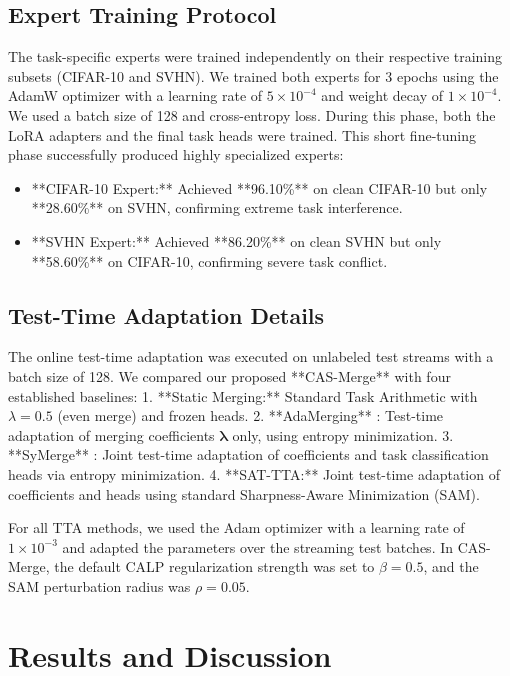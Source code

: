 \documentclass{article}
\begin{document}
\subsection{Expert Training Protocol}
The task-specific experts were trained independently on their respective training subsets (CIFAR-10 and SVHN). We trained both experts for 3 epochs using the AdamW optimizer with a learning rate of $5 \times 10^{-4}$ and weight decay of $1 \times 10^{-4}$. We used a batch size of 128 and cross-entropy loss. During this phase, both the LoRA adapters and the final task heads were trained. This short fine-tuning phase successfully produced highly specialized experts:
\begin{itemize}
    \item **CIFAR-10 Expert:** Achieved **96.10\%** on clean CIFAR-10 but only **28.60\%** on SVHN, confirming extreme task interference.
    \item **SVHN Expert:** Achieved **86.20\%** on clean SVHN but only **58.60\%** on CIFAR-10, confirming severe task conflict.
\end{itemize}

\subsection{Test-Time Adaptation Details}
The online test-time adaptation was executed on unlabeled test streams with a batch size of 128. We compared our proposed **CAS-Merge** with four established baselines:
1. **Static Merging:** Standard Task Arithmetic with $\lambda = 0.5$ (even merge) and frozen heads.
2. **AdaMerging** \cite{yang2024adamerging}: Test-time adaptation of merging coefficients $\boldsymbol{\lambda}$ only, using entropy minimization.
3. **SyMerge** \cite{jung2025symerge}: Joint test-time adaptation of coefficients and task classification heads via entropy minimization.
4. **SAT-TTA:** Joint test-time adaptation of coefficients and heads using standard Sharpness-Aware Minimization (SAM).

For all TTA methods, we used the Adam optimizer with a learning rate of $1 \times 10^{-3}$ and adapted the parameters over the streaming test batches. In CAS-Merge, the default CALP regularization strength was set to $\beta = 0.5$, and the SAM perturbation radius was $\rho = 0.05$.

\section{Results and Discussion}
\label{results_and_discussion}
\end{document}
